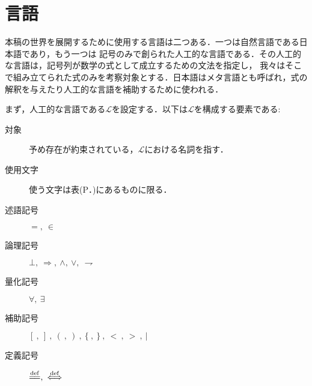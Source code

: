 	\begin{comment}
	\begin{quote}
		初めに言(ことば)があった。言は神と共にあった。言は神であった。\\
		この言は、初めに神と共にあった。\\
		万物は言によって成った。成ったもので、言によらずに成ったものは何一つなかった。
	\end{quote}
	ヨハネによる福音書の冒頭である．数学の世界もまたことばが支配する．
	ただし数学の世界におけることばには二つの階層がある．一つは記号や記号の並べ方を規定する下位のことばであり，
	もう一つは何が定理であるかを規定する上位のことばである．
	前者は我々が神の視点で創る世界のことばであり，後者は神である我々の世界のことばであるが，
	後者は論理と言い換える方が適当である．
	我々が創る世界は集合論と呼ばれ，数や関数など高校まで初等的に与えられてきたあらゆる概念がその世界の中で説明し直されることになる．
	我々が論理的思考を持っていたり自然にものを数えたり出来るのは，この世が神なる数学者によって創られたからであると信じて，
	本稿ではそういった生来の直感の一切合切を排して更地に立って数学を組み立てる．
	それは我々の我々による我々のための数学の世界である．つまり我々は本稿の神たる者となる．
	
	\end{comment}
	
\section{言語}
	本稿の世界を展開するために使用する言語は二つある．一つは自然言語である日本語であり，もう一つは
	記号のみで創られた人工的な言語である．その人工的な言語は，記号列が数学の式として成立するための文法を指定し，
	我々はそこで組み立てられた式のみを考察対象とする．日本語はメタ言語とも呼ばれ，式の解釈を与えたり人工的な言語を補助するために使われる．
	
	まず，人工的な言語である$\mathcal{L}$を設定する．以下は$\mathcal{L}$を構成する要素である:
	\begin{description}
		\item[対象] 予め存在が約束されている，$\mathcal{L}$における名詞を指す． 
		\item[使用文字] 使う文字は表(P．\pageref{tab:alphabet})にあるものに限る．
		\item[述語記号] $=,\ \in$
		\item[論理記号] $\bot,\ \Longrightarrow,\ \wedge,\ \vee,\ \rightharpoondown$
		\item[量化記号] $\forall,\ \exists$
		\item[補助記号] $[\ ,\ ]\ ,\ (\ ,\ )\ ,\ \{\ ,\ \}\ ,\ <\ ,\ >\ ,\ |$
		\item[定義記号] $\defeq,\ \defarrow$
	\end{description}
	
